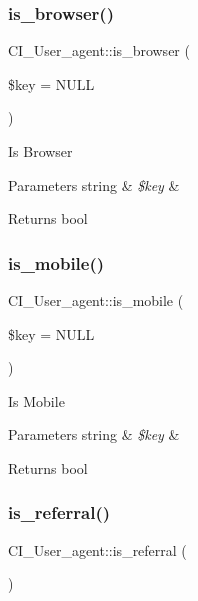\subsubsection{\texorpdfstring{is\+\_\+browser()}{is\_browser()}}
{\footnotesize\ttfamily C\+I\+\_\+\+User\+\_\+agent\+::is\+\_\+browser (\begin{DoxyParamCaption}\item[{}]{\$key = {\ttfamily NULL} }\end{DoxyParamCaption})}

Is Browser


\begin{DoxyParams}[1]{Parameters}
string & {\em \$key} & \\
\hline
\end{DoxyParams}
\begin{DoxyReturn}{Returns}
bool 
\end{DoxyReturn}
\mbox{\label{class_c_i___user__agent_ae3ba8ad834f68efdf7e320a077c15dff}} 
\subsubsection{\texorpdfstring{is\+\_\+mobile()}{is\_mobile()}}
{\footnotesize\ttfamily C\+I\+\_\+\+User\+\_\+agent\+::is\+\_\+mobile (\begin{DoxyParamCaption}\item[{}]{\$key = {\ttfamily NULL} }\end{DoxyParamCaption})}

Is Mobile


\begin{DoxyParams}[1]{Parameters}
string & {\em \$key} & \\
\hline
\end{DoxyParams}
\begin{DoxyReturn}{Returns}
bool 
\end{DoxyReturn}
\mbox{\label{class_c_i___user__agent_a05cf61e04f177ac408c56d092d37aa95}} 
\subsubsection{\texorpdfstring{is\+\_\+referral()}{is\_referral()}}
{\footnotesize\ttfamily C\+I\+\_\+\+User\+\_\+agent\+::is\+\_\+referral (\begin{DoxyParamCaption}{ }\end{DoxyParamCaption})}

